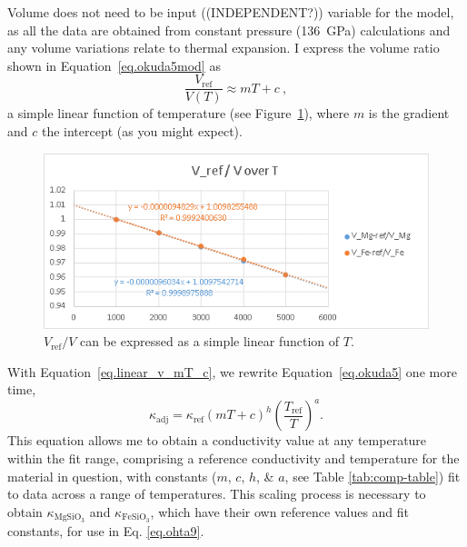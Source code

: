 Volume does not need to be input ((INDEPENDENT?)) variable for the model, as all the data are obtained from constant pressure (136~GPa) calculations and any volume variations relate to thermal expansion. I express the volume ratio shown in Equation~\ref{eq.okuda5mod} as 
%
\begin{equation}
\frac{V_{\mathrm{ref}}}{V(T)} \approx  mT+c \ ,
\label{eq.linear_v_mT_c}
\end{equation}
%
a simple linear function of temperature (see Figure~\ref{fig:draft_VrefV-T}), where $m$ is the gradient and $c$ the intercept (as you might expect). 

\begin{figure}[h!]
  \includegraphics[width=\linewidth]{Figures/draft_VrefV-T.png}
  \caption[CONTENTS BIT]{$V_{\mathrm{ref}}/V$ can be expressed as a simple linear function of $T$.}
  \label{fig:draft_VrefV-T}
\end{figure}

With Equation~\ref{eq.linear_v_mT_c}, we rewrite Equation~\ref{eq.okuda5} one more time,
%
\begin{equation}
\kappa_{\mathrm{adj}}=\kappa_{\mathrm{ref}} \left ( mT+c \right )^{h} \left ( \frac{T_{\mathrm{ref}}}{T} \right )^{a}.
\label{eq.okuda5modmod}
\end{equation}
%
This equation allows me to obtain a conductivity value at any temperature within the fit range, comprising a reference conductivity and temperature for the material in question, with constants ($m$, $c$, $h$, \& $a$, see Table \ref{tab:comp-table}) fit to data across a range of temperatures. This scaling process is necessary to obtain $\kappa_{\mathrm{MgSiO_{3}}}$ and $\kappa_{\mathrm{FeSiO_{3}}}$, which have their own reference values and fit constants, for use in Eq. \ref{eq.ohta9}.


